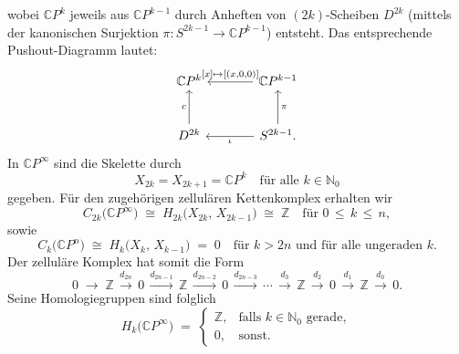 \documentclass[12pt, hidelinks]{article}
\numberwithin{conj}{section}
\begin{document}
                wobei \(\mathbb{C}P^k\) jeweils aus \(\mathbb{C}P^{k-1}\) durch Anheften von \((2k)\)-Scheiben \(D^{2k}\) (mittels der kanonischen Surjektion \(\pi \colon S^{2k-1} \to \mathbb{C}P^{k-1}\)) entsteht. Das entsprechende Pushout-Diagramm lautet:
                \[\begin{tikzcd}[sep=large]
                    {\mathbb{C}P^k} & {\mathbb{C}P^{k-1}} \\
                    {D^{2k}} & {S^{2k-1}}.
                    \arrow["{[x] \mapsto[(x,0,0)]}"', from=1-2, to=1-1]
                    \arrow["c", from=2-1, to=1-1]
                    \arrow["\pi"', from=2-2, to=1-2]
                    \arrow["\iota", from=2-2, to=2-1]
                    \end{tikzcd}\]
                    In \(\mathbb{C}P^\infty\) sind die Skelette durch
                    \[
                        X_{2k} = X_{2k+1} = \mathbb{C}P^k
                        \quad
                        \text{für alle } k \in \mathbb{N}_0
                    \]
                    gegeben. Für den zugehörigen zellulären Kettenkomplex erhalten wir
                    \[
                        C_{2k}\bigl(\mathbb{C}P^\infty\bigr)
                        \;\cong\;
                        H_{2k}\bigl(X_{2k},\,X_{2k-1}\bigr)
                        \;\cong\;
                        \mathbb{Z}
                        \quad
                        \text{für }
                        0 \,\leq\, k \,\leq\, n,
                    \]
                    sowie 
                    \[
                        C_k\bigl(\mathbb{C}P^n\bigr)
                        \;\cong\;
                        H_k\bigl(X_k,\,X_{k-1}\bigr) 
                        \;=\; 0
                        \quad
                        \text{für }
                        k > 2n
                        \text{ und für alle ungeraden } k.
                    \]
                    Der zelluläre Komplex hat somit die Form
                    \[
                        0 \;\longrightarrow\;
                        \mathbb{Z}
                        \,\xrightarrow{d_{2n}}\,
                        0
                        \,\xrightarrow{d_{2n-1}}\,
                        \mathbb{Z}
                        \,\xrightarrow{d_{2n-2}}\,
                        0
                        \,\xrightarrow{d_{2n-3}}\,
                        \cdots
                        \,\xrightarrow{d_{3}}\,
                        \mathbb{Z}
                        \,\xrightarrow{d_{2}}\,
                        0
                        \,\xrightarrow{d_{1}}\,
                        \mathbb{Z}
                        \,\xrightarrow{d_{0}}\,
                        0.
                    \]
                    Seine Homologiegruppen sind folglich
                    \[
                        H_k\bigl(\mathbb{C}P^\infty\bigr)
                        \;=\;
                        \begin{cases}
                            \mathbb{Z}, & \text{falls } k \in \mathbb{N}_0 \text{ gerade}, \\
                            0,          & \text{sonst}.                                    
                        \end{cases}
                    \]
                    
\end{document}
